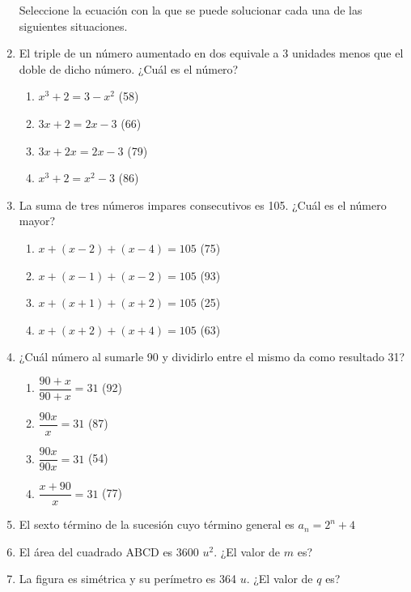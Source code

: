 \documentclass[letterpaper,10pt,twoside]{article}
\begin{document}
\begin{multicols}{2}
\begin{enumerate}
Seleccione la ecuación con la que se puede solucionar cada una de las siguientes situaciones.
\item El triple de un número aumentado en dos equivale a 3 unidades menos que el doble de dicho número. ¿Cuál es el número?
\begin{enumerate}
\item $x^{3}+2=3-x^{2}$ (58)
\item $3x+2=2x-3$ (66)
\item $3x+2x=2x-3$ (79)
\item $x^{3}+2=x^{2}-3$ (86)
\end{enumerate}
\item La suma de tres números impares consecutivos es 105. ¿Cuál es el número mayor?
\begin{enumerate}
\item $x+(x-2)+(x-4)=105$ (75)
\item $x+(x-1)+(x-2)=105$ (93)
\item $x+(x+1)+(x+2)=105$ (25)
\item $x+(x+2)+(x+4)=105$ (63)
\end{enumerate}
\item ¿Cuál número al sumarle 90 y dividirlo entre el mismo da como resultado 31?
\begin{enumerate}
\item $\dfrac{90+x}{90+x}=31$ (92)
\item $\dfrac{90x}{x}=31$ (87)
\item $\dfrac{90x}{90x}=31$ (54)
\item $\dfrac{x+90}{x}=31$ (77)
\end{enumerate}
\item El sexto término de la sucesión cuyo término general es $a_{n}=2^{n}+4$
\item El área del cuadrado ABCD es 3600 $u^{2}$. ¿El valor de $m$ es?
\begin{center}
\end{center}
\item La figura es simétrica y su perímetro es 364 $u$. ¿El valor de $q$ es?
\begin{center}

\end{center}
\end{enumerate}
\end{multicols}
\end{document}
